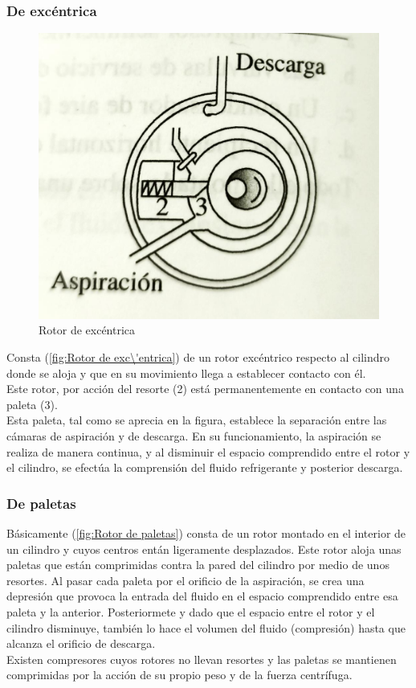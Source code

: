\subsubsection{De exc\'entrica}
\begin{figure}
	\centering
	\includegraphics[width=.7\linewidth]{figuras/compresores/rotor de excentrica.jpg}
	\caption{Rotor de exc\'entrica}
	\label{fig:Rotor de exc\'entrica}
\end{figure}
Consta (\autoref{fig:Rotor de exc\'entrica}) de un rotor exc\'entrico respecto al cilindro donde se aloja y que en su movimiento llega a establecer contacto con \'el.\\Este rotor, por acci\'on del resorte (2) est\'a permanentemente en contacto con una paleta (3).\\Esta paleta, tal como se aprecia en la figura, establece la separaci\'on entre las c\'amaras de aspiraci\'on y de descarga. En su funcionamiento, la aspiraci\'on se realiza de manera continua, y al disminuir el espacio comprendido entre el rotor y el cilindro, se efect\'ua la comprensi\'on del fluido refrigerante y posterior descarga.

\subsubsection{De paletas}

B\'asicamente (\autoref{fig:Rotor de paletas}) consta de un rotor montado en el interior de un cilindro y cuyos centros ent\'an ligeramente desplazados. Este rotor aloja unas paletas que est\'an comprimidas contra la pared del cilindro por medio de unos resortes. Al pasar cada paleta por el orificio de la aspiraci\'on, se crea una depresi\'on que provoca la entrada del fluido en el espacio comprendido entre esa paleta y la anterior. Posteriormete y dado que el espacio entre el rotor y el cilindro disminuye, tambi\'en lo hace el volumen del fluido (compresi\'on) hasta que alcanza el orificio de descarga.\\ Existen compresores cuyos rotores no llevan resortes y las paletas se mantienen comprimidas por la acci\'on de su propio peso y de la fuerza centr\'ifuga.

